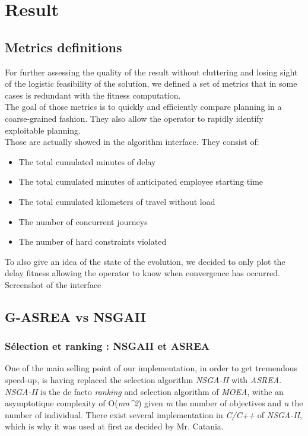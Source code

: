 \documentclass[12pt]{memoir}
\begin{document}
\section{Result}
\subsection{Metrics definitions}
For further assessing the quality of the result without cluttering and losing sight of the logistic feasibility of the solution, we defined a set of metrics that in some cases is redundant with the fitness computation. \\
The goal of those metrics is to quickly and efficiently compare planning in a coarse-grained fashion. They also allow the operator to rapidly identify exploitable planning.\\
Those are actually showed in the algorithm interface. They consist of: 
\begin{itemize}
  \item The total cumulated minutes of delay
  \item The total cumulated minutes of anticipated employee starting time
  \item The total cumulated kilometers of travel without load
  \item The number of concurrent journeys
  \item The number of hard constraints violated
\end{itemize}
To also give an idea of the state of the evolution, we decided to only plot the delay
fitness allowing the operator to know when convergence has occurred.
Screenshot of the interface
\subsection{G-ASREA vs NSGAII}
\subsubsection{Sélection et ranking : NSGAII et
	ASREA}\label{suxe9lection-et-ranking-nsgaii-et-asrea}

One of the main selling point of our implementation, in order to get tremendous speed-up, is having replaced the selection algorithm \emph{NSGA-II\cite{deb2002fast}} with \emph{ASREA\cite{sharma2010archived,tsutsui2013massively}}.\\

\emph{NSGA-II} is the de facto \emph{ranking} and selection algorithm of \emph{MOEA}, withe an asymptotique complexity of O(\emph{mn\^{}2}) given \emph{m} the number of objectives and \emph{n} the number of individual.
There exist several implementation in \emph{C/C++} of \emph{NSGA-II}, which is why it was used at first as decided by  Mr. Catania.\\
\end{document}
